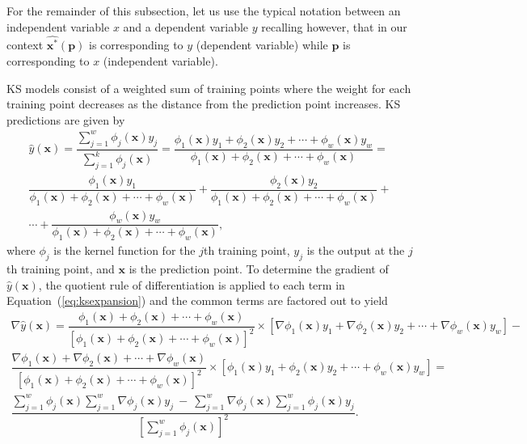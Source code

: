 For the remainder of this subsection, let us use the typical notation between an independent variable $x$ and a dependent variable $y$ recalling however, that in our context $\hat{\mathbf{x}^*}(\mathbf{p})$ is corresponding to $y$ (dependent variable) while $\mathbf{p}$ is corresponding to $x$ (independent variable).

\ac{KS} models consist of a weighted sum of training points where the weight for each training point decreases as the distance from the prediction point increases. \ac{KS} predictions are given by
%
\begin{multline}
 \label{eq:ksexpansion}
	\hat{y}(\mathbf{x}) = \dfrac{\sum_{j=1}^{w} \phi_j(\mathbf{x})y_j}{\sum_{j=1}^{k} \phi_j(\mathbf{x})} =
	\dfrac{\phi_1(\mathbf{x}) y_1 + \phi_2(\mathbf{x}) y_2 +\cdots + \phi_w(\mathbf{x}) y_w}{\phi_1(\mathbf{x})+ \phi_2(\mathbf{x})+\cdots + \phi_w(\mathbf{x})} = \\
	\dfrac{\phi_1(\mathbf{x}) y_1}{\phi_1(\mathbf{x})+ \phi_2(\mathbf{x}) + \cdots + \phi_w(\mathbf{x})} + \dfrac{\phi_2(\mathbf{x}) y_2}{\phi_1(\mathbf{x})+ \phi_2(\mathbf{x})+\cdots + \phi_w(\mathbf{x})} + \\
	 \cdots + \dfrac{\phi_w(\mathbf{x}) y_w}{\phi_1(\mathbf{x})+ \phi_2(\mathbf{x})+\cdots + \phi_w(\mathbf{x})},
\end{multline}
%
where $\phi_j$ is the kernel function for the $j$th training point, $y_j$ is the output at the $j$th training point, and $\mathbf{x}$ is the prediction point. 
%
To determine the gradient of $\hat{y}(\mathbf{x})$, the quotient rule of differentiation is applied to each term in Equation~(\ref{eq:ksexpansion}) and the common terms are factored out to yield
\begin{multline}
\label{eq:jacobiancomponent}
\nabla\hat{y}(\mathbf{x}) = \dfrac{\phi_1(\mathbf{x})+ \phi_2(\mathbf{x})+\cdots + \phi_w(\mathbf{x})}{\left[\phi_1(\mathbf{x})+ \phi_2(\mathbf{x})+\cdots + \phi_w(\mathbf{x})\right]^2} \times
\left[\nabla\phi_1(\mathbf{x}) y_1 + \nabla\phi_2(\mathbf{x}) y_2 +\cdots + \nabla\phi_w(\mathbf{x}) y_w\right] - \\
\dfrac{\nabla\phi_1(\mathbf{x})+ \nabla\phi_2(\mathbf{x})+ \cdots + \nabla\phi_w(\mathbf{x})}{\left[\phi_1(\mathbf{x})+ \phi_2(\mathbf{x})+\cdots + \phi_w(\mathbf{x})\right]^2} \times
\left[\phi_1(\mathbf{x}) y_1 + \phi_2(\mathbf{x}) y_2 +\cdots + \phi_w(\mathbf{x}) y_w\right] =\\
	\dfrac{{\sum_{j=1}^{w} \phi_j(\mathbf{x})} {\sum_{j=1}^{w} \nabla\phi_j(\mathbf{x})y_j}~-~{{\sum_{j=1}^{w} \nabla\phi_j(\mathbf{x})}{\sum_{j=1}^{w} \phi_j(\mathbf{x})y_j}}}{\left[\sum_{j=1}^{w} \phi_j(\mathbf{x})\right]^2}.
\end{multline}

